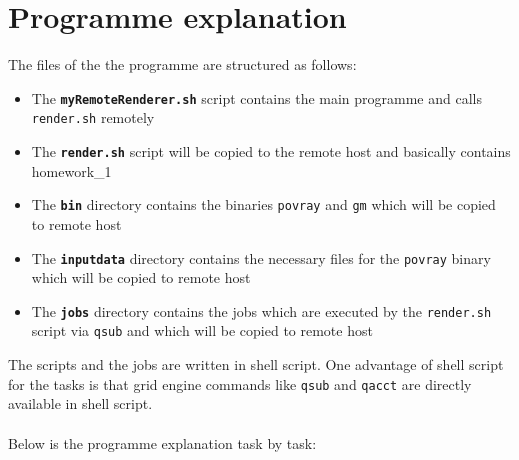 \documentclass{article}
\begin{document}



\section{Programme explanation}
The files of the the programme are structured as follows:

\begin{itemize}
\item The \texttt{\textbf{myRemoteRenderer.sh}} script contains the main programme and calls \texttt{render.sh} remotely
\item The \texttt{\textbf{render.sh}} script will be copied to the remote host and basically contains homework\_1
\item The \texttt{\textbf{bin}} directory contains the binaries \texttt{povray} and \texttt{gm} which will be copied to remote host
\item The \texttt{\textbf{inputdata}} directory contains the necessary files for the \texttt{povray} binary which will be copied to remote host
\item The \texttt{\textbf{jobs}} directory contains the jobs which are executed by the \texttt{render.sh} script via \texttt{qsub} and which will be copied to remote host
\end{itemize}

The scripts and the jobs are written in shell script. One advantage of shell script for the tasks is that grid engine commands like \texttt{qsub} and \texttt{qacct} are directly available in shell script.
\\
\\
Below is the programme explanation task by task:
\end{document}
